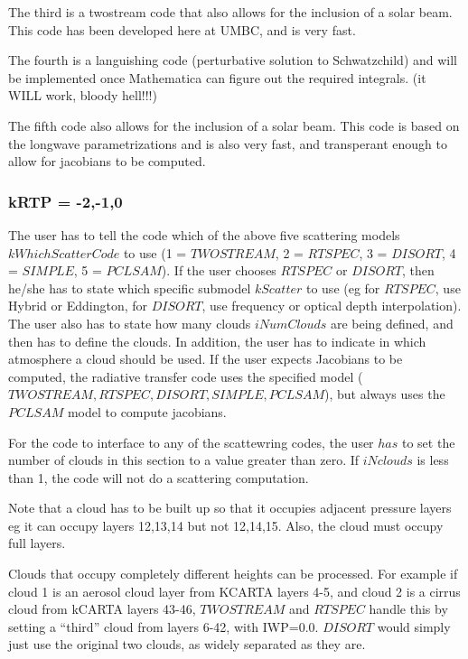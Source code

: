 \documentclass[12pt]{article}
\begin{document}
{{The third is a twostream code that also allows for the inclusion of a solar 
beam. This code has been developed here at UMBC, and is very fast.

The fourth is a languishing code (perturbative solution to Schwatzchild) and
will be implemented once Mathematica can figure out the required integrals.
(it WILL work, bloody hell!!!)

The fifth code also allows for the inclusion of a solar beam. This code is 
based on the longwave parametrizations and is also very fast, and transperant
enough to allow for jacobians to be computed.

\subsubsection{kRTP = -2,-1,0}
The user has to tell the code which of the above five scattering models 
$kWhichScatterCode$ to use (1 = $TWOSTREAM$, 2 = $RTSPEC$, 3 = $DISORT$, 
4 = $SIMPLE$, 5 = $PCLSAM$). 
If the user chooses $RTSPEC$ or $DISORT$, then he/she has to state which 
specific submodel $kScatter$ to use (eg for $RTSPEC$, use Hybrid or 
Eddington, for $DISORT$, use frequency or optical depth interpolation). The 
user also has to state how many clouds $iNumClouds$ are 
being  defined, and then has to define the clouds. In addition, the user has 
to indicate in which atmosphere a cloud should be used. If the user expects 
Jacobians to be computed, the radiative transfer code uses the specified
model ($TWOSTREAM,RTSPEC,DISORT,SIMPLE,PCLSAM$), but always uses the 
$PCLSAM$ model to compute jacobians.

For the code to interface to any of the scattewring codes, the user $has$ 
to set the number of clouds in this section to a value greater than zero.
If $iNclouds$ is less than 1, the code will not do a scattering computation. 

Note that a cloud has to be built up so that it occupies adjacent pressure 
layers eg it can occupy layers 12,13,14 but not 12,14,15. Also, the cloud 
must occupy full layers.

Clouds that occupy completely different heights can be processed. For example
if cloud 1 is an aerosol cloud layer from KCARTA layers 4-5, and cloud 2 is a  
cirrus cloud from kCARTA layers 43-46, $TWOSTREAM$ and $RTSPEC$ handle this by 
setting a  ``third'' cloud from layers 6-42, with IWP=0.0. $DISORT$ would 
simply just use the original two clouds, as widely separated as they are.

}}
\end{document}
